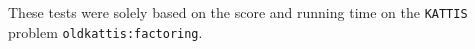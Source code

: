 These tests were solely based on the score and running time on  the 
\texttt{KATTIS} problem \texttt{oldkattis:factoring}.
